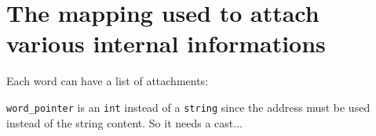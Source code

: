 \section{The mapping used to attach various internal informations}


Each word can have a list of attachments:

\verb|word_pointer| is an {\tt int} instead of a {\tt string} since
the address must be used instead of the string content. So it needs a
cast...



